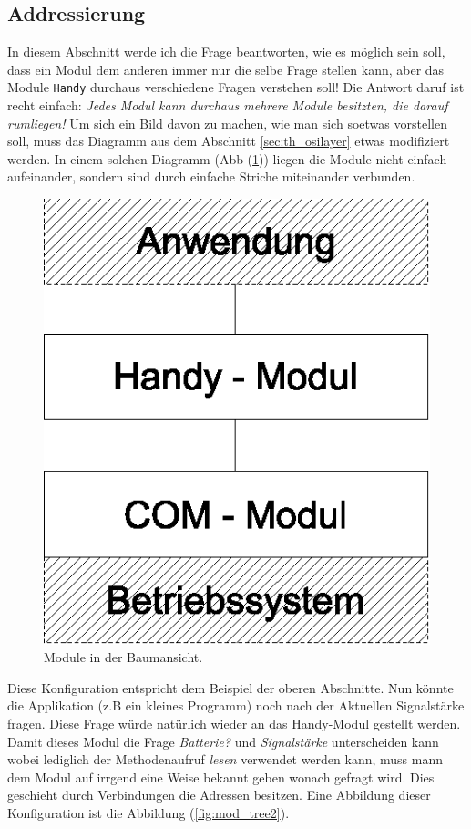 \documentclass[a4paper,10pt]{book}
\begin{document}
    \subsection{Addressierung}
    \label{sec:th_adressen}
    In diesem Abschnitt werde ich die Frage beantworten, wie es möglich sein
    soll, dass ein Modul dem anderen immer nur die selbe Frage stellen kann,
    aber das Module \texttt{Handy} durchaus verschiedene Fragen verstehen 
    soll! Die Antwort daruf ist recht einfach: \textit{Jedes Modul kann
    durchaus mehrere Module besitzten, die darauf rumliegen!} Um sich 
    ein Bild davon zu machen, wie man sich soetwas vorstellen soll,
    muss das Diagramm aus dem Abschnitt \ref{sec:th_osilayer} etwas 
    modifiziert werden. In einem solchen Diagramm 
    (Abb (\ref{fig:mod_tree})) liegen die Module nicht einfach aufeinander, 
    sondern sind durch einfache Striche miteinander verbunden.
    
    \begin{figure}
        \centering
        \includegraphics[scale=.8]{mod-tree.eps}
        \caption{Module in der Baumansicht.}
        \label{fig:mod_tree}
    \end{figure}
    
    Diese Konfiguration entspricht dem Beispiel der oberen Abschnitte.
    Nun könnte die Applikation (z.B ein kleines Programm) noch nach der 
    Aktuellen Signalstärke fragen. Diese Frage würde natürlich wieder an das
    Handy-Modul gestellt werden. Damit dieses Modul die Frage \emph{Batterie?}
    und \emph{Signalstärke} unterscheiden kann wobei lediglich der 
    Methodenaufruf \emph{lesen} verwendet werden kann, muss mann dem
    Modul auf irrgend eine Weise bekannt geben wonach gefragt wird. Dies 
    geschieht durch Verbindungen die Adressen besitzen. Eine Abbildung
    dieser Konfiguration ist die Abbildung (\ref{fig:mod_tree2}).
    
\end{document}
